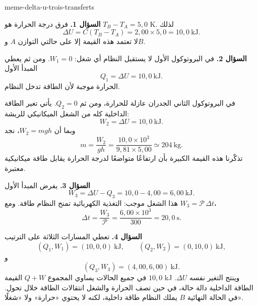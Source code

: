 \begin{exo}{meme-delta-u-trois-transferts}
\begin{solution}
\textbf{السؤال 1.} فرق درجة الحرارة هو $T_B-T_A=5{,}0$ K. لذلك
\[
\Delta U=C(T_B-T_A)
=2{,}00\times5{,}0
=10{,}0\ \mathrm{kJ}.
\]
لا تعتمد هذه القيمة إلا على حالتي التوازن $A$ و$B$.

\textbf{السؤال 2.} في البروتوكول الأول لا يستقبل النظام أي شغل: $W_1=0$.
ومن ثم يعطي المبدأ الأول
\[
Q_1=\Delta U=10{,}0\ \mathrm{kJ}.
\]
الحرارة موجبة لأن الطاقة تدخل النظام.

في البروتوكول الثاني الجدران عازلة للحرارة، ومن ثم $Q_2=0$. يأتي تغير الطاقة
الداخلية كله من الشغل الميكانيكي للريشة:
\[
W_2=\Delta U=10{,}0\ \mathrm{kJ}.
\]
وبما أن $W_2=mgh$، نجد
\[
m=\frac{W_2}{gh}
=\frac{10{,}0\times10^3}{9{,}81\times5{,}00}
\simeq 204\ \mathrm{kg}.
\]
تذكّرنا هذه القيمة الكبيرة بأن ارتفاعًا متواضعًا لدرجة الحرارة يقابل طاقة
ميكانيكية معتبرة.

\textbf{السؤال 3.} يفرض المبدأ الأول
\[
W_3=\Delta U-Q_3=10{,}0-4{,}00=6{,}00\ \mathrm{kJ}.
\]
هذا الشغل موجب: التغذية الكهربائية تمنح النظام طاقة. ومع $W_3=\mathcal P\,\Delta t$،
\[
\Delta t=\frac{W_3}{\mathcal P}
=\frac{6{,}00\times10^3}{300}
=20{,}0\ \mathrm{s}.
\]

\textbf{السؤال 4.} تعطي المسارات الثلاثة على الترتيب
\[
(Q_1,W_1)=(10{,}0,0)\ \mathrm{kJ},
\qquad
(Q_2,W_2)=(0,10{,}0)\ \mathrm{kJ},
\]
و
\[
(Q_3,W_3)=(4{,}00,6{,}00)\ \mathrm{kJ}.
\]
في جميع الحالات يساوي المجموع $Q+W$ القيمة $10{,}0$ kJ وينتج التغير نفسه
$\Delta U$. الطاقة الداخلية دالة حالة، في حين تصف الحرارة والشغل انتقالات
الطاقة خلال تحول. في الحالة النهائية $B$ يملك النظام طاقة داخلية، لكنه لا
يحتوي «حرارة» ولا «شغلًا».
\end{solution}
\end{exo}

